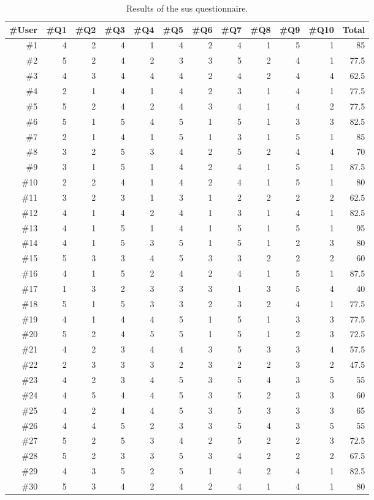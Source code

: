 \begin{table}
  \caption{Results of the \ac{sus} questionnaire.}
 \label{tbl:sus_questionnaire_results}
\footnotesize
\centering
 \begin{tabular}{r r r r r r r r r r r r}
  \hline 
  \textbf{\#User} &\textbf{\#Q1} & \textbf{\#Q2}& \textbf{\#Q3}& \textbf{\#Q4}& \textbf{\#Q5}& \textbf{\#Q6}& \textbf{\#Q7}& \textbf{\#Q8}& \textbf{\#Q9} & \textbf{\#Q10} & \textbf{Total}\\
  \hline
  \#1 & 4	& 2& 	4& 	1& 	4& 	2& 	4& 	1& 	5& 	1& 85	\\
  \#2 & 5&	2&	4&	2&	3&	3&	5&	2&	4&	1& 77.5	\\
  \#3 & 4&	3&	4&	4&	4&	2&	4&	2&	4&	4& 62.5	\\
  \#4 & 2&	1&	4&	1&	4&	2&	3&	1&	4&	1& 77.5	\\
  \#5 & 5&	2&	4&	2&	4&	3&	4&	1&	4&	2& 77.5	\\
  \#6 & 5&	1&	5&	4&	5&	1&	5&	1&	3&	3& 82.5	\\
  \#7 & 2&	1&	4&	1&	5&	1&	3&	1&	5&	1& 85	\\
  \#8 & 3&	2&	5&	3&	4&	2&	5&	2&	4&	4& 70	\\
  \#9 & 3&	1&	5&	1&	4&	2&	4&	1&	5&	1& 87.5	\\
  \#10 & 2&	2&	4&	1&	4&	2&	4&	1&	5&	1& 80	\\
  \#11 & 3&	2&	3&	1&	3&	1&	2&	2&	2&	2& 62.5	\\
  \#12 & 4&	1&	4&	2&	4&	1&	3&	1&	4&	1& 82.5	\\
  \#13 & 4&	1&	5&	1&	4&	1&	5&	1&	5&	1& 95	\\
  \#14 & 4&	1&	5&	3&	5&	1&	5&	1&	2&	3& 80	\\
  \#15 & 5&	3&	3&	4&	5&	3&	3&	2&	2&	2& 60	\\
  \#16 & 4&	1&	5&	2&	4&	2&	4&	1&	5&	1& 87.5	\\
  \#17 & 1&	3&	2&	3&	3&	3&	1&	3&	5&	4& 40	\\
  \#18 & 5&	1&	5&	3&	3&	2&	3&	2&	4&	1& 77.5	\\
  \#19 & 4&	1&	4&	4&	5&	1&	5&	1&	3&	3& 77.5	\\
  \#20 & 5&	2&	4&	5&	5&	1&	5&	1&	2&	3& 72.5	\\
  \#21 & 4&	2&	3&	4&	4&	3&	5&	3&	3&	4& 57.5	\\
  \#22 & 2&	3&	3&	3&	2&	3&	2&	2&	3&	2& 47.5	\\
  \#23 & 4&	2&	3&	4&	5&	3&	5&	4&	3&	5& 55	\\
  \#24 & 4&	5&	4&	4&	5&	3&	5&	2&	3&	3& 60	\\
  \#25 & 4&	2&	4&	4&	5&	3&	5&	3&	3&	3& 65	\\
  \#26 & 4&	4&	5&	2&	3&	3&	5&	4&	3&	5& 55	\\
  \#27 & 5&	2&	5&	3&	4&	2&	5&	2&	2&	3& 72.5	\\
  \#28 & 5&	2&	3&	3&	5&	3&	4&	2&	2&	2& 67.5	\\
  \#29 & 4&	3&	5&	2&	5&	1&	4&	2&	4&	1& 82.5	\\
  \#30 & 5&	3&	4&	2&	4&	2&	4&	1&	4&	1& 80	\\
  \hline
\end{tabular}
\end{table}